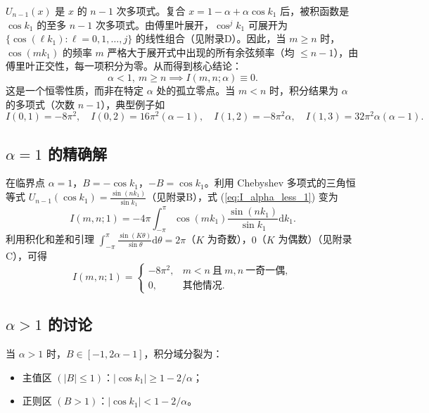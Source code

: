 \documentclass{article} %
\newcommand{\di}{\mathrm{d}}
\begin{document}
$U_{n-1}(x)$ 是 $x$ 的 $n-1$ 次多项式。复合 $x=1-\alpha+\alpha\cos k_1$ 后，被积函数是 $\cos k_1$ 的至多 $n-1$ 次多项式。由傅里叶展开，$\cos^j k_1$ 可展开为 $\{\cos(\ell k_1): \ell=0,1,\dots,j\}$ 的线性组合（见附录D）。因此，当 $m \ge n$ 时，$\cos(mk_1)$ 的频率 $m$ 严格大于展开式中出现的所有余弦频率（均 $\le n-1$），由傅里叶正交性，每一项积分为零。从而得到核心结论：
\begin{equation}
    \boxed{\alpha < 1,\ m \ge n \implies I(m,n;\alpha) \equiv 0.}
    \label{eq:theorem_alpha_less_1}
\end{equation}
这是一个恒零性质，而非在特定 $\alpha$ 处的孤立零点。当 $m < n$ 时，积分结果为 $\alpha$ 的多项式（次数 $n-1$），典型例子如
\begin{equation}
    I(0,1) = -8\pi^2, \quad I(0,2) = 16\pi^2(\alpha-1), \quad I(1,2) = -8\pi^2\alpha, \quad I(1,3) = 32\pi^2\alpha(\alpha-1).
    \label{eq:I_examples}
\end{equation}

\subsection{$\alpha = 1$ 的精确解}

在临界点 $\alpha=1$，$B = -\cos k_1$，$-B = \cos k_1$。利用 Chebyshev 多项式的三角恒等式 $U_{n-1}(\cos k_1) = \frac{\sin(nk_1)}{\sin k_1}$（见附录B），式 (\ref{eq:I_alpha_less_1}) 变为
\begin{equation}
    I(m,n;1) = -4\pi \int_{-\pi}^{\pi} \cos(mk_1) \frac{\sin(nk_1)}{\sin k_1} \di k_1.
    \label{eq:I_alpha_eq_1_start}
\end{equation}
利用积化和差和引理 $\int_{-\pi}^{\pi} \frac{\sin(K\theta)}{\sin\theta} \di\theta = 2\pi$（$K$ 为奇数），$0$（$K$ 为偶数）（见附录C），可得
\begin{equation}
    \boxed{
    I(m,n;1) =
    \begin{cases}
        -8\pi^2, & m < n \ \text{且}\ m,n \ \text{一奇一偶},\\
        0, & \text{其他情况}.
    \end{cases}
    }
    \label{eq:theorem_alpha_eq_1}
\end{equation}

\subsection{$\alpha > 1$ 的讨论}

当 $\alpha > 1$ 时，$B \in [-1, 2\alpha-1]$，积分域分裂为：
\begin{itemize}
    \item 主值区 $(|B| \le 1)$：$|\cos k_1| \ge 1 - 2/\alpha$；
    \item 正则区 $(B > 1)$：$|\cos k_1| < 1 - 2/\alpha$。
\end{itemize}
\end{document}
